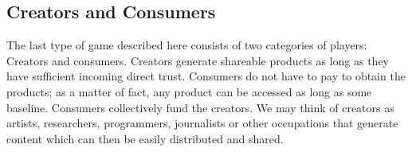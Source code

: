 \subsection{Creators and Consumers}
  The last type of game described here consists of two categories of players: Creators and consumers. Creators generate
  shareable products as long as they have sufficient incoming direct trust. Consumers do not have to pay to obtain the
  products; as a matter of fact, any product can be accessed as long as some baseline. Consumers collectively fund the
  creators. We may think of creators as artists, researchers, programmers, journalists or other occupations that generate
  content which can then be easily distributed and shared.
